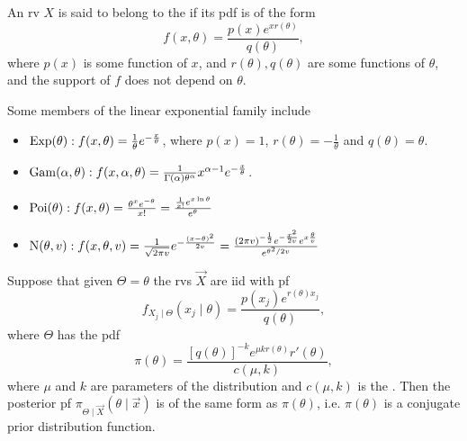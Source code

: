 \documentclass[notoc,notitlepage]{tufte-book}
\begin{document}
\begin{defn}\label{defn:linear_exponential_family}
  An rv $X$ is said to belong to the  if its
  pdf is of the form
  \begin{equation*}
    f(x,\theta) = \frac{p(x)e^{xr(\theta)}}{q(\theta)},
  \end{equation*}
  where $p(x)$ is some function of $x$, and $r(\theta), q(\theta)$ are some
  functions of $\theta$, and the support of $f$ does not depend on $\theta$.
\end{defn}


\begin{eg}
  Some members of the linear exponential family include
  \begin{itemize}
    \item $\operatorname{Exp}(\theta): f(x, \theta) = \frac{1}{\theta}
      e^{-\frac{x}{\theta}}$, where $p(x) = 1$, $r(\theta) = -\frac{1}{\theta}$ 
      and $q(\theta) = \theta$.
    \item $\operatorname{Gam}(\alpha, \theta): f(x, \alpha, \theta) =
      \frac{1}{\Gamma(\alpha)\theta^\alpha} x^{\alpha - 1}
      e^{-\frac{x}{\theta}}$.
    \item $\operatorname{Poi}(\theta): f(x, \theta) = \frac{\theta^x e^{-\theta}}{x!} =
      \frac{\frac{1}{x!} e^{x \ln \theta}}{e^\theta}$
    \item $\operatorname{N}(\theta, v) : f(x, \theta, v) = \frac{1}{\sqrt{2\pi v}}
      e^{-\frac{(x-\theta)^2}{2v}} = \frac{(2\pi v)^{-\frac{1}{2}}
      e^{-\frac{x^2}{2v}} e^{x \frac{\theta}{v}}}{e^{\theta^2 / 2v}}$
  \end{itemize}
\end{eg}

\begin{thm}\label{thm:conjugate_prior_distributions_of_linear_exponential_distributions}
  Suppose that given $\Theta = \theta$ the rvs $\vec{X}$ are iid with pf
  \begin{equation*}
    f_{X_j \mid \Theta} (x_j \mid \theta) = \frac{p(x_j)e^{r(\theta)
    x_j}}{q(\theta)},
  \end{equation*}
  where $\Theta$ has the pdf
  \begin{equation*}
    \pi(\theta) = \frac{[q(\theta)]^{-k} e^{\mu kr(\theta)} r'(\theta)}{c(\mu,
    k)},
  \end{equation*}
  where $\mu$ and $k$ are parameters of the distribution and $c(\mu, k)$ is the
   . Then
  the posterior pf $\pi_{\Theta \mid \vec{X}}(\theta \mid \vec{x})$ is of the
  same form as $\pi(\theta)$, i.e. $\pi(\theta)$ is a conjugate prior
  distribution function.
\end{thm}
\end{document}
